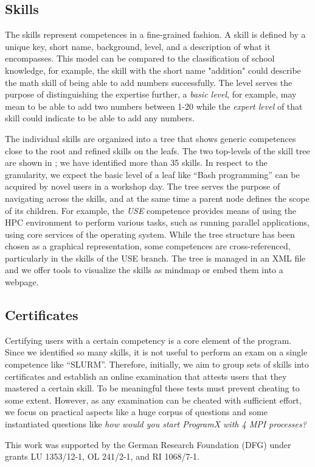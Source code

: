 \documentclass[jocse]{jocseart}
\newcommand{\jk}[1]{\todo[inline]{TODO: #1}}
\begin{document}
\jk{Old stuff}


\subsection{Skills}

The skills represent competences in a fine-grained fashion.
A skill is defined by a unique key, short name, background, level, and a description of what it encompasses.
This model can be compared to the classification of school knowledge, for example, the skill with the short name "addition" could describe the math skill of being able to add numbers successfully.
The level serves the purpose of distinguishing the expertise further, a \textit{basic level}, for example, may mean to be able to add two numbers between 1-20 while the \textit{expert level} of that skill could indicate to be able to add any numbers.

The individual skills are organized into a tree that shows generic competences close to the root and refined skills on the leafs.
The two top-levels of the skill tree are shown in ; we have identified more than 35 skills.
In respect to the granularity, we expect the basic level of a leaf like “Bash programming” can be acquired by novel users in a workshop day.
The tree serves the purpose of navigating across the skills, and at the same time a parent node defines the scope of its children.
For example, the \textit{USE} competence provides means of using the HPC environment to perform various tasks, such as running parallel applications, using core services of the operating system.
While the tree structure has been chosen as a graphical representation, some competences are cross-referenced, particularly in the skills of the USE branch.
The tree is managed in an XML file and we offer tools to visualize the skills as mindmap or embed them into a webpage.

\subsection{Certificates}

Certifying users with a certain competency is a core element of the program.
Since we identified so many skills, it is not useful to perform an exam on a single competence like “SLURM”.
Therefore, initially, we aim to group sets of skills into certificates and establish an online examination that attests users that they mastered a certain skill.
To be meaningful these tests must prevent cheating to some extent.
However, as any examination can be cheated with sufficient effort, we focus on practical aspects like a huge corpus of questions and some instantiated questions like \textit{how would you start ProgramX with 4 MPI processes?}




\appendix

\begin{acks}
\small
This work was supported by the German Research Foundation (DFG) under grants LU 1353/12-1, OL 241/2-1, and RI 1068/7-1.
\end{acks}



\end{document}
